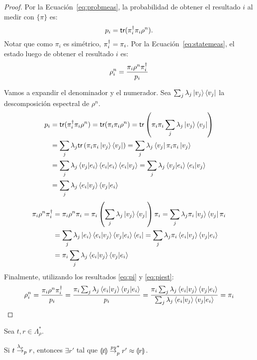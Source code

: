\begin{proof}
Por la Ecuación~\ref{eq:probmeas}, la probabilidad de obtener el resultado $i$ al medir con $\{ \pi \}$ es:
\[p_i = \mathsf{tr}(\pi_i^\dagger\pi_i\rho^n).\]
Notar que como $\pi_i$ es simétrico, $\pi_i^\dagger=\pi_i$. Por la Ecuación~\ref{eq:statemeas}, el estado luego de obtener el resultado $i$ es:
\[\rho^n_i = \frac{\pi_i\rho^n\pi_i^\dagger}{p_i}\]

Vamos a expandir el denominador y el numerador. Sea $\sum_j \lambda_j \ket{v_j}\bra{v_j}$ la descomposición espectral de $\rho^n$. 
\begin{align}
p_i &= \mathsf{tr}(\pi_i^\dagger\pi_i\rho^n) = \mathsf{tr}(\pi_i\pi_i\rho^n) = \mathsf{tr}\left(\pi_i\pi_i\sum_j \lambda_j \ket{v_j}\bra{v_j}\right) \nonumber\\
&= \sum_j \lambda_j \mathsf{tr}\left(\pi_i\pi_i \ket{v_j}\bra{v_j}\right) = \sum_j \lambda_j \bra{v_j}\pi_i\pi_i\ket{v_j} \nonumber\\
&= \sum_j \lambda_j \braket{v_j|e_i}\braket{e_i|e_i}\braket{e_i|v_j} = \sum_j \lambda_j \braket{v_j|e_i}\braket{e_i|v_j} \nonumber\\
&= \sum_j \lambda_j \braket{e_i|v_j}\braket{v_j|e_i} \label{eq:pi}
\end{align}
\begin{align}
\pi_i\rho^n\pi_i^\dagger &= \pi_i\rho^n\pi_i = \pi_i\left(\sum_j \lambda_j \ket{v_j}\bra{v_j}\right)\pi_i = \sum_j \lambda_j \pi_i\ket{v_j}\bra{v_j}\pi_i\nonumber\\
&= \sum_j \lambda_j \ket{e_i}\braket{e_i|v_j}\braket{v_j|e_i}\bra{e_i} = \sum_j \lambda_j \pi_i\braket{e_i|v_j}\braket{v_j|e_i}\nonumber\\
&=  \pi_i \sum_j \lambda_j\braket{e_i|v_j}\braket{v_j|e_i} \label{eq:piest}
\end{align}
Finalmente, utilizando los resultados \ref{eq:pi} y \ref{eq:piest}:
\begin{align*}
\rho^n_i = \frac{\pi_i\rho^n\pi_i^\dagger}{p_i} = \frac{\pi_i \sum_j \lambda_j\braket{e_i|v_j}\braket{v_j|e_i}}{p_i} = \frac{\pi_i \sum_j \lambda_j\braket{e_i|v_j}\braket{v_j|e_i}}{\sum_j \lambda_j \braket{e_i|v_j}\braket{v_j|e_i}} = \pi_i
\end{align*}
\end{proof}
\begin{teorema}[Correctitud]
Sea $t, r \in \Lambda_\rho^*$.

Si $t \overset{\lambda_\rho}{\rightarrow}_p r$, entonces  $\exists r'$ tal que $\llparenthesis t \rrparenthesis \overset{\textit{py}}{\rightarrow}_p^* r' \approx \llparenthesis r \rrparenthesis$.
\end{teorema}
